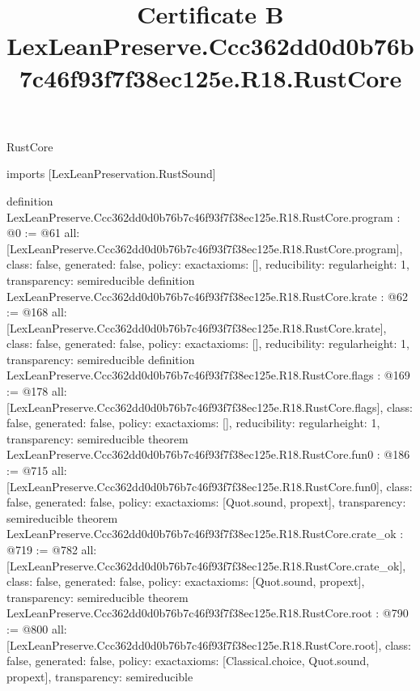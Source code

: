 \begin{lexlean}{RustCore}
\title{Certificate B LexLeanPreserve.Ccc362dd0d0b76b7c46f93f7f38ec125e.R18.RustCore}
\begin{coremodule}
imports [LexLeanPreservation.RustSound]

definition LexLeanPreserve.Ccc362dd0d0b76b7c46f93f7f38ec125e.R18.RustCore.program : @0 := @61 {
  all: [LexLeanPreserve.Ccc362dd0d0b76b7c46f93f7f38ec125e.R18.RustCore.program],
  class: false,
  generated: false,
  policy: exact{axioms: []},
  reducibility: regular{height: 1},
  transparency: semireducible
}
definition LexLeanPreserve.Ccc362dd0d0b76b7c46f93f7f38ec125e.R18.RustCore.krate : @62 := @168 {
  all: [LexLeanPreserve.Ccc362dd0d0b76b7c46f93f7f38ec125e.R18.RustCore.krate],
  class: false,
  generated: false,
  policy: exact{axioms: []},
  reducibility: regular{height: 1},
  transparency: semireducible
}
definition LexLeanPreserve.Ccc362dd0d0b76b7c46f93f7f38ec125e.R18.RustCore.flags : @169 := @178 {
  all: [LexLeanPreserve.Ccc362dd0d0b76b7c46f93f7f38ec125e.R18.RustCore.flags],
  class: false,
  generated: false,
  policy: exact{axioms: []},
  reducibility: regular{height: 1},
  transparency: semireducible
}
theorem LexLeanPreserve.Ccc362dd0d0b76b7c46f93f7f38ec125e.R18.RustCore.fun0 : @186 := @715 {
  all: [LexLeanPreserve.Ccc362dd0d0b76b7c46f93f7f38ec125e.R18.RustCore.fun0],
  class: false,
  generated: false,
  policy: exact{axioms: [Quot.sound, propext]},
  transparency: semireducible
}
theorem LexLeanPreserve.Ccc362dd0d0b76b7c46f93f7f38ec125e.R18.RustCore.crate_ok : @719 := @782 {
  all: [LexLeanPreserve.Ccc362dd0d0b76b7c46f93f7f38ec125e.R18.RustCore.crate_ok],
  class: false,
  generated: false,
  policy: exact{axioms: [Quot.sound, propext]},
  transparency: semireducible
}
theorem LexLeanPreserve.Ccc362dd0d0b76b7c46f93f7f38ec125e.R18.RustCore.root : @790 := @800 {
  all: [LexLeanPreserve.Ccc362dd0d0b76b7c46f93f7f38ec125e.R18.RustCore.root],
  class: false,
  generated: false,
  policy: exact{axioms: [Classical.choice, Quot.sound, propext]},
  transparency: semireducible
}


\end{coremodule}
\end{lexlean}
